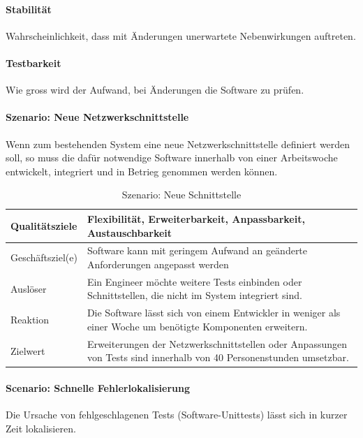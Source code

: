 \documentclass[]{subfiles}
\begin{document}
		\paragraph{Stabilität}
			Wahrscheinlichkeit, dass mit Änderungen unerwartete Nebenwirkungen auftreten.

		\paragraph{Testbarkeit}
			Wie gross wird der Aufwand, bei Änderungen die Software zu prüfen.

		\newpage

		\paragraph{Szenario: Neue Netzwerkschnittstelle}
			Wenn zum bestehenden System eine neue Netzwerkschnittstelle definiert werden soll, so muss die dafür notwendige Software innerhalb von einer Arbeitswoche entwickelt, integriert und in Betrieg genommen werden können.
			
			\begin{table}[!h]
				\begin{tabularx}{\textwidth}{lX}
					\toprule
					Qualitätsziele & Flexibilität, Erweiterbarkeit, Anpassbarkeit, Austauschbarkeit  \\
					\midrule
					Geschäftsziel(e) & Software kann mit geringem Aufwand an geänderte Anforderungen angepasst werden  \\
					\midrule
					Auslöser & Ein Engineer möchte weitere Tests einbinden oder Schnittstellen, die nicht im System integriert sind.  \\
					\midrule
					Reaktion & Die Software lässt sich von einem Entwickler in weniger als einer Woche um benötigte Komponenten erweitern.  \\
					\midrule
					Zielwert & 	Erweiterungen der Netzwerkschnittstellen oder Anpassungen von Tests sind innerhalb von 40 Personenstunden umsetzbar.  \\
					\bottomrule
				\end{tabularx}
				\caption{Szenario: Neue Schnittstelle}
			\end{table}
			

		\paragraph{Scenario: Schnelle Fehlerlokalisierung}
			Die Ursache von fehlgeschlagenen Tests (Software-Unittests) lässt sich in kurzer Zeit lokalisieren.
			
\end{document}
